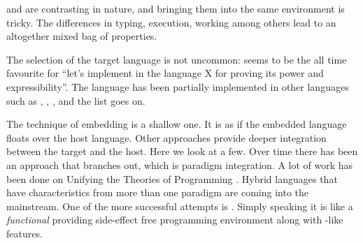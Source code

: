 \documentclass[thesis-solanki.tex]{subfiles}
\begin{document}
 and  are contrasting in nature, and
bringing them into the same environment is tricky.
The differences in typing, execution, working among others lead to an altogether mixed bag of properties.


The selection of the target language is not uncommon:
   seems 
to be the all time favourite for ``let's implement  in
the language X for proving
its
power and 
expressibility''. The  language has been partially implemented \cite{swipembedd} in other 
languages such as  \cite{racklog},   
\cite{komorowski1982qlog,robinson1982loglisp,robinson1980loglisp},  \cite{wikiprolog, jlog}, 
 \cite{jscriptlog} and the list \cite{yieldprolog} goes on.

The technique of embedding is a shallow one.
It is as if the embedded language floats over the host language.
Other approaches provide deeper integration between the target and the host.
Here
we look at a few.
Over time there has been an approach that branches out, which is paradigm integration.
A lot of work has been done on Unifying the Theories of Programming
\cite{DBLP:conf/utp/2006,DBLP:conf/utp/2008,DBLP:conf/utp/2010,DBLP:conf/utp/2012,hoare1998unifying,
  gibbons2013unifying}.
Hybrid languages that have characteristics from more than one paradigm are coming into the
mainstream.
One of the more successful attempts is  \cite{website:scala}. Simply speaking it is like a \textit{functional} 
 providing side-effect free programming environment along with
-like features.
\end{document}
